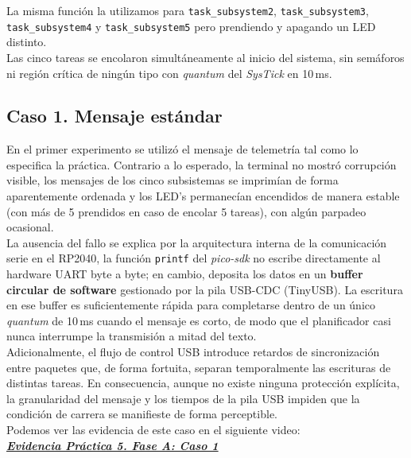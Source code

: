 \documentclass[12pt,letterpaper]{article}
\begin{document}
\bigskip

\noindent
La misma función la utilizamos para \texttt{task\_subsystem2}, \texttt{task\_subsystem3}, \texttt{task\_subsystem4} y \texttt{task\_subsystem5} pero prendiendo y apagando un LED distinto.\\

\noindent
Las cinco tareas se encolaron simultáneamente al inicio del sistema, sin semáforos ni región crítica de ningún tipo con \textit{quantum} del \textit{SysTick} en 10\,ms.

\subsection*{Caso 1. Mensaje estándar}
En el primer experimento se utilizó el mensaje de telemetría tal como lo especifica la práctica. Contrario a lo esperado, la terminal no mostró corrupción visible, los mensajes de los cinco subsistemas se imprimían de forma aparentemente ordenada y los LED's permanecían encendidos de manera estable (con más de 5 prendidos en caso de encolar 5 tareas), con algún parpadeo ocasional.\\

La ausencia del fallo se explica por la arquitectura interna de la comunicación serie en el RP2040, la función \texttt{printf} del \textit{pico-sdk} no escribe directamente al hardware UART byte a byte; en cambio, deposita los datos en un \textbf{buffer circular de software} gestionado por la pila USB-CDC (TinyUSB). La escritura en ese buffer es suficientemente rápida para completarse dentro de un único \textit{quantum} de 10\,ms cuando el mensaje es corto, de modo que el planificador casi nunca interrumpe la transmisión a mitad del texto.\\

Adicionalmente, el flujo de control USB introduce retardos de sincronización entre paquetes que, de forma fortuita, separan temporalmente las escrituras de distintas tareas. En consecuencia, aunque no existe ninguna protección explícita, la granularidad del mensaje y los tiempos de la pila USB impiden que la condición de carrera se manifieste de forma perceptible.\\

\noindent
Podemos ver las evidencia de este caso en el siguiente video:\\

\href{https://drive.google.com/file/d/1uVFFZONrw-ooMVKhCwuL4oLu651Wa1V4/view?usp=drive_link}
     {\textbf{\textit{\textcolor{linkblue}{Evidencia Práctica 5. Fase A: Caso 1}}}}
\end{document}

